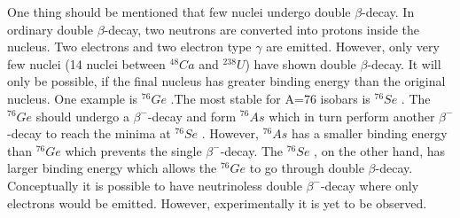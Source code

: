 One thing should be mentioned that few nuclei undergo double $\beta$-decay. In ordinary double $\beta$-decay, two neutrons are converted into protons inside the nucleus. Two electrons and two electron type $\gamma$ are emitted. However, only very few nuclei (14
nuclei between ${}^{48}Ca $ and ${}^{238}U $) have shown double $\beta$-decay. It will only be possible, if the final nucleus has greater binding energy than the original nucleus. One example is ${}^{76}Ge $ .The most stable for A=76 isobars is ${}^{76}Se $ . The ${}^{76}Ge $ should undergo a $\beta^-$-decay  and form $^{76}As$ which in turn perform another  $\beta^-$-decay to reach the minima at ${}^{76}Se $ . However, $^{76}As$ has a smaller binding energy than ${}^{76}Ge $ which prevents the single $\beta^-$-decay. The ${}^{76}Se $ , on the other hand, has larger binding energy which allows the ${}^{76}Ge $ to go through double $\beta$-decay. Conceptually it is possible to have neutrinoless double $\beta^-$-decay where only electrons would be emitted. However, experimentally it is yet to be observed.